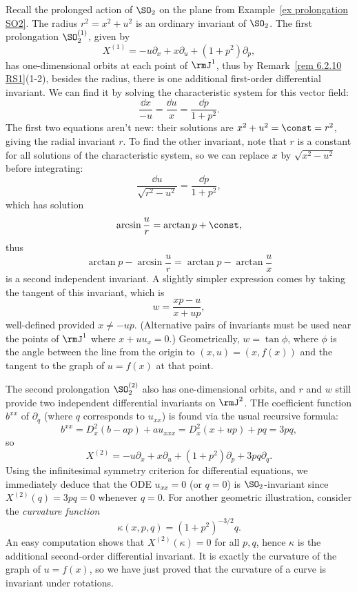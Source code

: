 \begin{example}
    Recall the prolonged action of $\SO_2$ on the plane from Example~\ref{ex prolongation SO2}. The radius $r^2=x^2+u^2$ is an ordinary invariant of $\SO_2$. The first prolongation $\SO_2^{(1)}$, given by 
    \[X^{(1)}=-u\partial_x+x\partial_u+(1+p^2)\partial_p,\] 
    has one-dimensional orbits at each point of $\rmJ^1$, thus by Remark~\ref{rem 6.2.10 RS1}(1-2), besides the radius, there is one additional first-order differential invariant. We can find it by solving the characteristic system for this vector field:
    \[\frac{\dd x}{-u}=\frac{\dd u}{x}=\frac{\dd p}{1+p^2}.\]
    The first two equations aren't new: their solutions are $x^2+u^2=\const=r^2$, giving the radial invariant $r$. To find the other invariant, note that $r$ is a constant for all solutions of the characteristic system, so we can replace $x$ by $\sqrt{x^2-u^2}$ before integrating:
    \[\frac{\dd u}{\sqrt{r^2-u^2}}=\frac{\dd p}{1+p^2},\]
    which has solution 
    \[\arcsin\frac{u}{r}=\arctan p+\const,\]
    thus 
    \[\arctan p-\arcsin\frac{u}{r}=\arctan p-\arctan\frac{u}{x}\]
    is a second independent invariant. A slightly simpler expression comes by taking the tangent of this invariant, which is
    \[w=\frac{xp-u}{x+up},\]
    well-defined provided $x\neq -up$. (Alternative pairs of invariants must be used near the points of $\rmJ^1$ where $x+uu_x=0$.) Geometrically, $w=\tan\phi$, where $\phi$ is the angle between the line from the origin to $(x,u)=(x,f(x))$ and the tangent to the graph of $u=f(x)$ at that point. 
    
    The second prolongation $\SO_2^{(2)}$ also has one-dimensional orbits, and $r$ and $w$ still provide two independent differential invariants on $\rmJ^2$. THe coefficient function $b^{xx}$ of $\partial_q$ (where $q$ corresponds to $u_{xx}$) is found via the usual recursive formula:
    \[b^{xx}=D_x^2(b-a p)+au_{xxx}=D_x^2(x+up)+pq=3pq,\]
    so 
    \[X^{(2)}=-u\partial_x+x\partial_u+(1+p^2)\partial_p+3pq\partial_q.\]
    Using the infinitesimal symmetry criterion for differential equations, we immediately deduce that the ODE $u_{xx}=0$ (or $q=0$) is $\SO_2$-invariant since $X^{(2)}(q)=3pq=0$ whenever $q=0$. For another geometric illustration, consider the \emph{curvature function} 
    \[\kappa(x,p,q)=(1+p^2)^{-3/2}q.\]
    An easy computation shows that $X^{(2)}(\kappa)=0$ for all $p,q$, hence $\kappa$ is the additional second-order differential invariant. It is exactly the curvature of the graph of $u=f(x)$, so we have just proved that the curvature of a curve is invariant under rotations.
\end{example}


